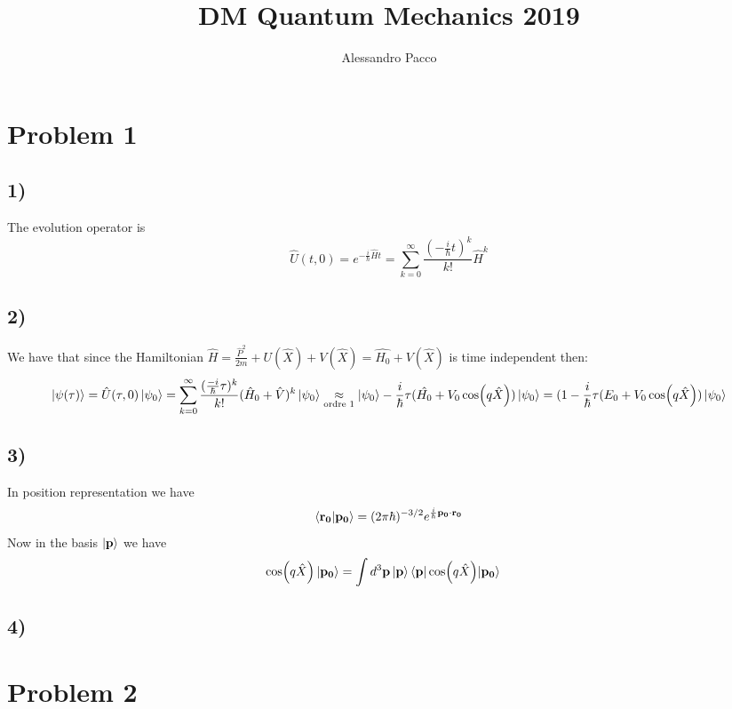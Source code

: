 \documentclass[10pt,a4paper]{book}
\author{Alessandro Pacco}
\title{DM Quantum Mechanics 2019}
\begin{document}
 
\maketitle

\section*{Problem 1}


\subsection*{1)}

The evolution operator is 
$$\hat{U}(t,0)=e^{-\frac{i}{\hbar}\hat{H}t}=\sum_{k=0}^{\infty} \frac{(-\frac{i}{\hbar}t)^k}{k!}\hat{H}^k$$


\subsection*{2)}

We have that since the Hamiltonian $\hat{H}=\frac{\hat{P}^2}{2m}+U(\hat{X})+V(\hat{X})=\hat{H_0}+V(\hat{X})$ is time independent then:
$$\ket{\psi(\tau)}=\hat{U}(\tau,0)\ket{\psi_0}=\sum_{k=0}^{\infty}\frac{(\frac{-i}{\hbar}\tau)^k}{k!}(\hat{H}_0+\hat{V})^k\ket{\psi_0}\underset{\text{ordre }1}{\approx} \ket{\psi_0}-\frac{i}{\hbar}\tau(\hat{H_0}+V_0\cos(q\hat{X}))\ket{\psi_0}=(1-\frac{i}{\hbar}\tau( E_0+V_0\cos(q\hat{X}))\ket{\psi_0}$$

\subsection*{3)}

In position representation we have 
$$\braket{\mathbf{r_0}|\mathbf{p_0}}=(2\pi \hbar)^{-3/2}e^{\frac{i}{\hbar}\mathbf{p_0}\cdot\mathbf{r_0}}$$
Now in the basis $\ket{\mathbf{p}}$ we have
\begin{align*}
\cos(q\hat{X})\ket{\mathbf{p_0}}&=
\int d^3\mathbf{p}\ket{\mathbf{p}}\braket{\mathbf{p}|\cos(q\hat{X})|\mathbf{p_0}}
\end{align*}


\subsection*{4)}


\section*{Problem 2}
\end{document}
